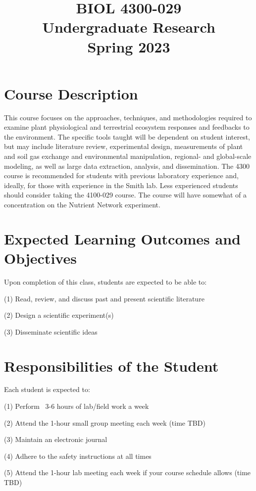 \documentclass[12pt, notitlepage]{article}   	%
\title{
	\textbf{
		BIOL 4300-029
	} \\
	\large Undergraduate Research \\
	\large Spring 2023
}
\date{\vspace{-5ex}}
\begin{document}
{\selectfont %

\maketitle

\section{Course Description}
This course focuses on the approaches, techniques, and methodologies required to 
examine plant physiological and terrestrial ecosystem responses and feedbacks to 
the environment. The specific tools taught will be dependent on student interest, 
but may include literature review, experimental design, measurements of plant and 
soil gas exchange and environmental manipulation, regional- and global-scale modeling, 
as well as large data extraction, analysis, and dissemination. The 4300 course is 
recommended for students with previous laboratory experience and, ideally, 
for those with experience in the Smith lab. Less experienced students should 
consider taking the 4100-029 course. The course will have somewhat of a concentration on
the Nutrient Network experiment.

\section{Expected Learning Outcomes and Objectives}
Upon completion of this class, students are expected to be able to:\par
(1)	Read, review, and discuss past and present scientific literature\par
(2) Design a scientific experiment(s)\par
(3) Disseminate scientific ideas\par

\section{Responsibilities of the Student}
Each student is expected to:\par
(1) Perform ~3-6 hours of lab/field work a week\par
(2) Attend the 1-hour small group meeting each week (time TBD)\par
(3) Maintain an electronic journal\par
(4) Adhere to the safety instructions at all times\par
(5) Attend the 1-hour lab meeting each week if your course schedule allows (time TBD)\par

}
\end{document}

